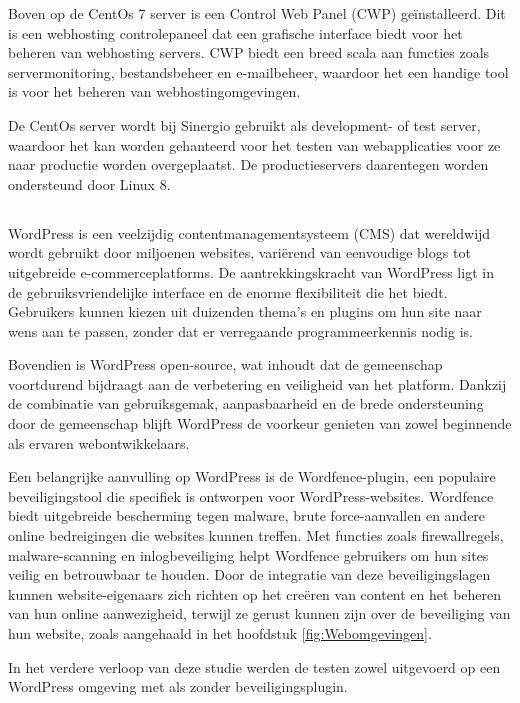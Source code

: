 Boven op de CentOs 7 server is een Control Web Panel (CWP) geïnstalleerd. Dit is een webhosting controlepaneel dat
een grafische interface biedt voor het beheren van webhosting servers. CWP biedt een breed scala aan functies zoals
servermonitoring, bestandsbeheer en e-mailbeheer, waardoor het een handige tool is voor het beheren van webhostingomgevingen.

De CentOs server wordt bij Sinergio gebruikt als development- of test server, waardoor het kan worden gehanteerd voor het 
testen van webapplicaties voor ze naar productie worden overgeplaatst. De productieservers daarentegen worden ondersteund 
door Linux 8.

\subsection{}
WordPress is een veelzijdig contentmanagementsysteem (CMS) dat wereldwijd wordt gebruikt door miljoenen websites, variërend van 
eenvoudige blogs tot uitgebreide e-commerceplatforms. De aantrekkingskracht van WordPress ligt in de gebruiksvriendelijke 
interface en de enorme flexibiliteit die het biedt. Gebruikers kunnen kiezen uit duizenden thema's en plugins om hun site 
naar wens aan te passen, zonder dat er verregaande programmeerkennis nodig is. 

Bovendien is WordPress open-source, wat inhoudt dat de 
gemeenschap voortdurend bijdraagt aan de verbetering en veiligheid van het platform. Dankzij de combinatie van gebruiksgemak, 
aanpasbaarheid en de brede ondersteuning door de gemeenschap blijft WordPress de voorkeur genieten van zowel beginnende als 
ervaren webontwikkelaars.

Een belangrijke aanvulling op WordPress is de Wordfence-plugin, een populaire beveiligingstool die specifiek is ontworpen 
voor WordPress-websites. Wordfence biedt uitgebreide bescherming tegen malware, brute force-aanvallen en andere online 
bedreigingen die websites kunnen treffen. Met functies zoals firewallregels, malware-scanning en inlogbeveiliging helpt 
Wordfence gebruikers om hun sites veilig en betrouwbaar te houden. Door de integratie van deze beveiligingslagen kunnen 
website-eigenaars zich richten op het creëren van content en het beheren van hun online aanwezigheid, terwijl ze gerust 
kunnen zijn over de beveiliging van hun website, zoals aangehaald in het hoofdstuk \ref{fig:Webomgevingen}.

In het verdere verloop van deze studie werden de testen zowel uitgevoerd op een WordPress omgeving met als zonder 
beveiligingsplugin.

